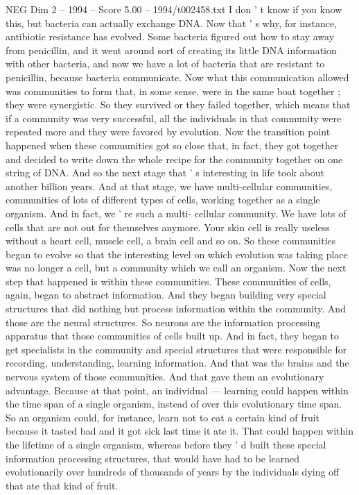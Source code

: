 \begin{textsample}{NEG Dim 2 – 1994 – Score 5.00 – 1994/t002458.txt}
I don ' t know if you know this, but bacteria can actually exchange DNA.
Now that ' s why, for instance, antibiotic resistance has evolved.
Some bacteria figured out how to stay away from penicillin, and it went around sort of creating its little DNA information with other bacteria, and now we have a lot of bacteria that are resistant to penicillin, because bacteria communicate.
Now what this communication allowed was communities to form that, in some sense, were in the same boat together ; they were synergistic.
So they survived or they failed together, which means that if a community was very successful, all the individuals in that community were repeated more and they were favored by evolution.
Now the transition point happened when these communities got so close that, in fact, they got together and decided to write down the whole recipe for the community together on one string of DNA.
And so the next stage that ' s interesting in life took about another billion years.
And at that stage, we have multi-cellular communities, communities of lots of different types of cells, working together as a single organism.
And in fact, we ' re such a multi- cellular community.
We have lots of cells that are not out for themselves anymore.
Your skin cell is really useless without a heart cell, muscle cell, a brain cell and so on.
So these communities began to evolve so that the interesting level on which evolution was taking place was no longer a cell, but a community which we call an organism.
Now the next step that happened is within these communities.
These communities of cells, again, began to abstract information.
And they began building very special structures that did nothing but process information within the community.
And those are the neural structures.
So neurons are the information processing apparatus that those communities of cells built up.
And in fact, they began to get specialists in the community and special structures that were responsible for recording, understanding, learning information.
And that was the brains and the nervous system of those communities.
And that gave them an evolutionary advantage.
Because at that point, an individual — learning could happen within the time span of a single organism, instead of over this evolutionary time span.
So an organism could, for instance, learn not to eat a certain kind of fruit because it tasted bad and it got sick last time it ate it.
That could happen within the lifetime of a single organism, whereas before they ' d built these special information processing structures, that would have had to be learned evolutionarily over hundreds of thousands of years by the individuals dying off that ate that kind of fruit.

\end{textsample}

